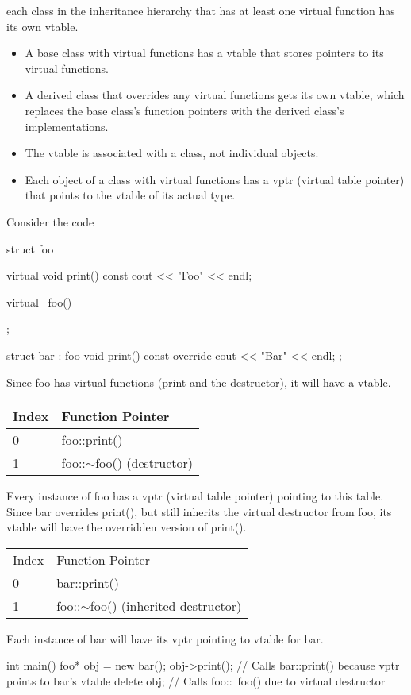 \documentclass{report}
\begin{document}
    \bigbreak \noindent 
    each class in the inheritance hierarchy that has at least one virtual function has its own vtable.
    \begin{itemize}
        \item A base class with virtual functions has a vtable that stores pointers to its virtual functions.
        \item A derived class that overrides any virtual functions gets its own vtable, which replaces the base class’s function pointers with the derived class’s implementations.
        \item The vtable is associated with a class, not individual objects.
        \item Each object of a class with virtual functions has a vptr (virtual table pointer) that points to the vtable of its actual type.
    \end{itemize}
    \bigbreak \noindent 
    Consider the code
    \bigbreak \noindent 
    \begin{cppcode}
        struct foo {
            virtual void print() const {
                cout << "Foo" << endl;
            }

            virtual ~foo() {}
        };

        struct bar : foo {
            void print() const override {
                cout << "Bar" << endl;
            }
        };
    \end{cppcode}
    \bigbreak \noindent 
    Since foo has virtual functions (print and the destructor), it will have a vtable.
    \begin{center}
        \begin{tabular}{p{4cm}|p{4cm}} 
            Index	&Function Pointer \\
            \hline
            0	&foo::print() \\
            1	&foo::$\sim$foo() (destructor) 
        \end{tabular}
    \end{center}
    \bigbreak \noindent 
    Every instance of foo has a vptr (virtual table pointer) pointing to this table.
    \bigbreak \noindent 
    Since bar overrides print(), but still inherits the virtual destructor from foo, its vtable will have the overridden version of print().
    \begin{center}
        \begin{tabular}{p{4cm}|p{4cm}}
            Index	&Function Pointer \\
            0	&bar::print() \\
            1	&foo::$\sim$foo() (inherited destructor) 
        \end{tabular}
    \end{center}
    \bigbreak \noindent 
    Each instance of bar will have its vptr pointing to vtable for bar.
    \bigbreak \noindent 
    \begin{cppcode}
        int main() {
            foo* obj = new bar();
            obj->print();  // Calls bar::print() because vptr points to bar's vtable
            delete obj;    // Calls foo::~foo() due to virtual destructor
        }
    \end{cppcode}
\end{document}
